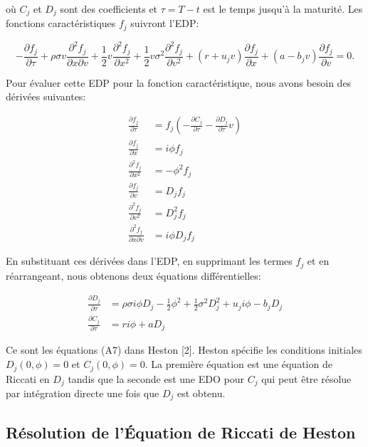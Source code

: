 où $C_j$ et $D_j$ sont des coefficients et $\tau = T - t$ est le temps jusqu'à la maturité. Les fonctions caractéristiques $f_j$ suivront l'EDP:

\begin{equation}
-\frac{\partial f_j}{\partial \tau} + \rho\sigma v\frac{\partial^2 f_j}{\partial x \partial v} + \frac{1}{2}v\frac{\partial^2 f_j}{\partial x^2} + \frac{1}{2}v\sigma^2\frac{\partial^2 f_j}{\partial v^2} + (r + u_j v)\frac{\partial f_j}{\partial x} + (a - b_j v)\frac{\partial f_j}{\partial v} = 0.
\end{equation}

Pour évaluer cette EDP pour la fonction caractéristique, nous avons besoin des dérivées suivantes:

\begin{align}
\frac{\partial f_j}{\partial \tau} &= f_j \left(-\frac{\partial C_j}{\partial \tau} - \frac{\partial D_j}{\partial \tau} v \right) \\
\frac{\partial f_j}{\partial x} &= i\phi f_j \\
\frac{\partial^2 f_j}{\partial x^2} &= -\phi^2 f_j \\
\frac{\partial f_j}{\partial v} &= D_j f_j \\
\frac{\partial^2 f_j}{\partial v^2} &= D_j^2 f_j \\
\frac{\partial^2 f_j}{\partial x \partial v} &= i\phi D_j f_j
\end{align}

En substituant ces dérivées dans l'EDP, en supprimant les termes $f_j$ et en réarrangeant, nous obtenons deux équations différentielles:

\begin{align}
\frac{\partial D_j}{\partial \tau} &= \rho\sigma i\phi D_j - \frac{1}{2}\phi^2 + \frac{1}{2}\sigma^2 D_j^2 + u_j i\phi - b_j D_j \\
\frac{\partial C_j}{\partial \tau} &= ri\phi + aD_j
\end{align}

Ce sont les équations (A7) dans Heston [2]. Heston spécifie les conditions initiales $D_j(0, \phi) = 0$ et $C_j(0, \phi) = 0$. La première équation est une équation de Riccati en $D_j$ tandis que la seconde est une EDO pour $C_j$ qui peut être résolue par intégration directe une fois que $D_j$ est obtenu.

\subsection{Résolution de l'Équation de Riccati de Heston}

